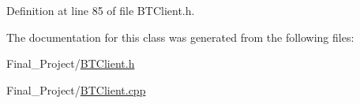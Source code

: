 Definition at line 85 of file B\-T\-Client.\-h.



The documentation for this class was generated from the following files\-:\begin{DoxyCompactItemize}
\item 
Final\-\_\-\-Project/\hyperlink{BTClient_8h}{B\-T\-Client.\-h}\item 
Final\-\_\-\-Project/\hyperlink{BTClient_8cpp}{B\-T\-Client.\-cpp}\end{DoxyCompactItemize}
